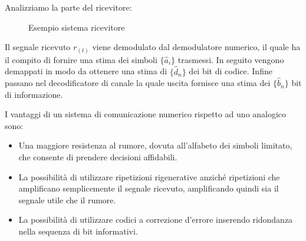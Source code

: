     Analizziamo la parte del ricevitore:
    \begin{figure}[H]
        \centering
        \caption{Esempio sistema ricevitore}
    \end{figure}
    Il segnale ricevuto $r_{(t)}$ viene demodulato dal demodulatore numerico, il quale ha il compito di fornire una stima dei simboli $\{\hat{a}_i\}$ trasmessi.
    In seguito vengono demappati in modo da ottenere una stima di $\{\hat{d}_n\}$ dei bit di codice. Infine passano nel decodificatore di canale la quale uscita 
    fornisce una stima dei $\{\hat{b}_n\}$ bit di informazione.

    I vantaggi di un sistema di comunicazione numerico rispetto ad uno analogico sono:
    \begin{itemize}
        \item {
            Una maggiore resistenza al rumore, dovuta all'alfabeto dei simboli limitato, che consente di prendere decisioni affidabili.
        }
        \item {
            La possibilità di utilizzare ripetizioni rigenerative anziché ripetizioni che amplificano semplicemente il segnale ricevuto, amplificando quindi sia il segnale
            utile che il rumore. 
        }
        \item {
            La possibilità di utilizzare codici a correzione d'errore inserendo ridondanza nella sequenza di bit informativi.
        }
    \end{itemize}
